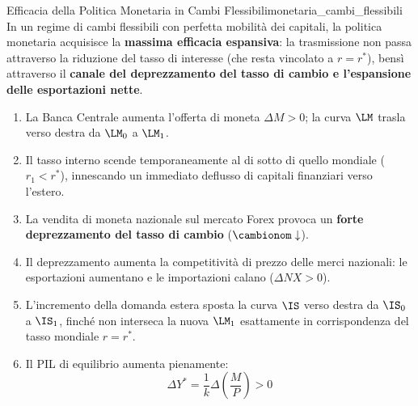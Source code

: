 \begin{teorema}{Efficacia della Politica Monetaria in Cambi Flessibili}{monetaria_cambi_flessibili}
In un regime di cambi flessibili con perfetta mobilità dei capitali, la politica monetaria acquisisce la \textbf{massima efficacia espansiva}: la trasmissione non passa attraverso la riduzione del tasso di interesse (che resta vincolato a $r = r^*$), bensì attraverso il \textbf{canale del deprezzamento del tasso di cambio e l'espansione delle esportazioni nette}.
\end{teorema}

\begin{dimostrazione}
\begin{enumerate}
    \item La Banca Centrale aumenta l'offerta di moneta $\Delta M > 0$; la curva $\LM$ trasla verso destra da $\LM_0$ a $\LM_1$.
    \item Il tasso interno scende temporaneamente al di sotto di quello mondiale ($r_1 < r^*$), innescando un immediato deflusso di capitali finanziari verso l'estero.
    \item La vendita di moneta nazionale sul mercato Forex provoca un \textbf{forte deprezzamento del tasso di cambio} ($\cambionom \downarrow$).
    \item Il deprezzamento aumenta la competitività di prezzo delle merci nazionali: le esportazioni aumentano e le importazioni calano ($\Delta NX > 0$).
    \item L'incremento della domanda estera sposta la curva $\IS$ verso destra da $\IS_0$ a $\IS_1$, finché non interseca la nuova $\LM_1$ esattamente in corrispondenza del tasso mondiale $r = r^*$.
    \item Il PIL di equilibrio aumenta pienamente:
    \begin{equation}
        \Delta Y^* = \frac{1}{k}\Delta\left(\frac{M}{P}\right) > 0
    \end{equation}
\end{enumerate}
\end{dimostrazione}

